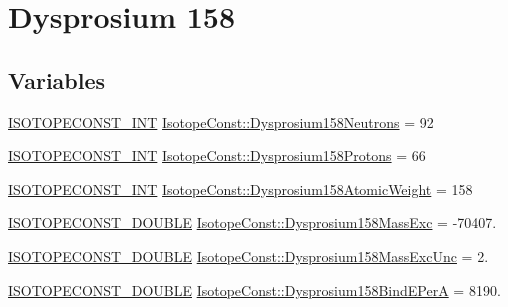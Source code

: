 \hypertarget{group___isotope_const-_dysprosium-_dy158}{}\section{Dysprosium 158}
\label{group___isotope_const-_dysprosium-_dy158}
\subsection*{Variables}
\begin{DoxyCompactItemize}
\item 
\mbox{\hyperlink{group___isotope_const-_macros_ga5f18360b3e99483a35c32d789e62621c}{I\+S\+O\+T\+O\+P\+E\+C\+O\+N\+S\+T\+\_\+\+I\+NT}} \mbox{\hyperlink{group___isotope_const-_dysprosium-_dy158_ga22e574996072a25777d771f17c8b0304}{Isotope\+Const\+::\+Dysprosium158\+Neutrons}} = 92
\item 
\mbox{\hyperlink{group___isotope_const-_macros_ga5f18360b3e99483a35c32d789e62621c}{I\+S\+O\+T\+O\+P\+E\+C\+O\+N\+S\+T\+\_\+\+I\+NT}} \mbox{\hyperlink{group___isotope_const-_dysprosium-_dy158_gac8978d8bf222377a435785a4524040eb}{Isotope\+Const\+::\+Dysprosium158\+Protons}} = 66
\item 
\mbox{\hyperlink{group___isotope_const-_macros_ga5f18360b3e99483a35c32d789e62621c}{I\+S\+O\+T\+O\+P\+E\+C\+O\+N\+S\+T\+\_\+\+I\+NT}} \mbox{\hyperlink{group___isotope_const-_dysprosium-_dy158_ga139c3b63a97205da9c3525e2b4d56c00}{Isotope\+Const\+::\+Dysprosium158\+Atomic\+Weight}} = 158
\item 
\mbox{\hyperlink{group___isotope_const-_macros_ga8f45a7272ce02c0b4c65c44636ed719a}{I\+S\+O\+T\+O\+P\+E\+C\+O\+N\+S\+T\+\_\+\+D\+O\+U\+B\+LE}} \mbox{\hyperlink{group___isotope_const-_dysprosium-_dy158_ga8d4823883e42eb4d627a8406b44634e2}{Isotope\+Const\+::\+Dysprosium158\+Mass\+Exc}} = -\/70407.
\item 
\mbox{\hyperlink{group___isotope_const-_macros_ga8f45a7272ce02c0b4c65c44636ed719a}{I\+S\+O\+T\+O\+P\+E\+C\+O\+N\+S\+T\+\_\+\+D\+O\+U\+B\+LE}} \mbox{\hyperlink{group___isotope_const-_dysprosium-_dy158_ga31095ab0a6fe10bb59df91b484820b6e}{Isotope\+Const\+::\+Dysprosium158\+Mass\+Exc\+Unc}} = 2.
\item 
\mbox{\hyperlink{group___isotope_const-_macros_ga8f45a7272ce02c0b4c65c44636ed719a}{I\+S\+O\+T\+O\+P\+E\+C\+O\+N\+S\+T\+\_\+\+D\+O\+U\+B\+LE}} \mbox{\hyperlink{group___isotope_const-_dysprosium-_dy158_gabe383be08909917bc78b937ee0fc4185}{Isotope\+Const\+::\+Dysprosium158\+Bind\+E\+PerA}} = 8190.
\item 

\end{DoxyCompactItemize}
